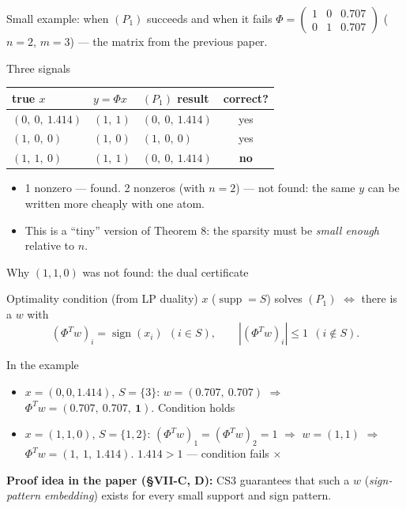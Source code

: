 \documentclass[aspectratio=169,11pt]{beamer}
\newcommand{\en}[1]{\textit{#1}}          %
\begin{document}
\begin{frame}{Small example: when $(P_1)$ succeeds and when it fails}
  $\Phi=\begin{pmatrix}1&0&0.707\\0&1&0.707\end{pmatrix}$ ($n=2$, $m=3$) --- the matrix from the previous paper.
  \begin{exampleblock}{Three signals}
    \centering
    \begin{tabular}{@{}lllc@{}}
      \toprule
      true $x$ & $y=\Phi x$ & $(P_1)$ result & correct? \\
      \midrule
      $(0,\ 0,\ 1.414)$ & $(1,\ 1)$ & $(0,\ 0,\ 1.414)$ & yes \\
      $(1,\ 0,\ 0)$ & $(1,\ 0)$ & $(1,\ 0,\ 0)$ & yes \\
      $(1,\ 1,\ 0)$ & $(1,\ 1)$ & $(0,\ 0,\ 1.414)$ & \textbf{no} \\
      \bottomrule
    \end{tabular}
  \end{exampleblock}
  \begin{itemize}
    \item 1 nonzero --- found. 2 nonzeros (with $n=2$) --- not found: the same $y$ can be written more cheaply with one atom.
    \item This is a ``tiny'' version of Theorem 8: the sparsity must be \emph{small enough} relative to $n$.
  \end{itemize}
\end{frame}

\begin{frame}{Why $(1,1,0)$ was not found: the dual certificate}
  \begin{block}{Optimality condition (from LP duality)}
    $x$ ($\operatorname{supp}=S$) solves $(P_1)$ $\iff$ there is a $w$ with
    \[ (\Phi^Tw)_i=\operatorname{sign}(x_i)\ \ (i\in S),\qquad |(\Phi^Tw)_i|\le1\ \ (i\notin S). \]
  \end{block}
  \begin{exampleblock}{In the example}
    \begin{itemize}
      \item $x=(0,0,1.414)$, $S=\{3\}$: $w=(0.707,\ 0.707)$ $\Rightarrow$ $\Phi^Tw=(0.707,\ 0.707,\ \mathbf{1})$. Condition holds \checkmark
      \item $x=(1,1,0)$, $S=\{1,2\}$: $(\Phi^Tw)_1=(\Phi^Tw)_2=1$ $\Rightarrow$ $w=(1,1)$ $\Rightarrow$ $\Phi^Tw=(1,\ 1,\ \mathbf{1.414})$. $1.414>1$ --- condition fails $\times$
    \end{itemize}
  \end{exampleblock}
  {\small\textbf{Proof idea in the paper (\S VII-C, D):} CS3 guarantees that such a $w$ (\en{sign-pattern embedding}) exists for every small support and sign pattern.}
\end{frame}
\end{document}
